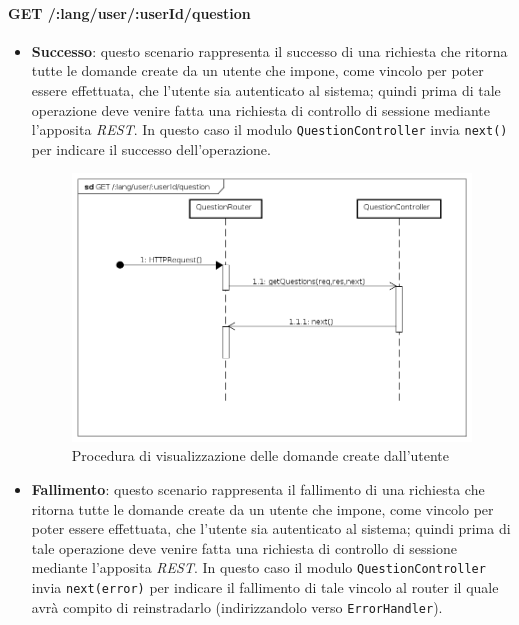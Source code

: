 
\paragraph{GET /:lang/user/:userId/question}
\begin{itemize}
\item \textbf{Successo}: questo scenario rappresenta il successo di una richiesta che ritorna tutte le domande create da un utente che impone, come vincolo per poter essere effettuata, che l'utente sia autenticato al sistema; quindi prima di tale operazione deve venire fatta una richiesta di controllo di sessione mediante l'apposita \textit{REST}. In questo caso il modulo \texttt{QuestionController} invia \texttt{next()} per indicare il successo dell'operazione.

\begin{figure}[ht]
	\centering
	\includegraphics[scale=0.45]{UML/DiagrammiDiSequenza/Back-end/GET__lang_user__userId_question_success.png}
	\caption{Procedura di visualizzazione delle domande create dall'utente}
\end{figure}
\FloatBarrier

\item \textbf{Fallimento}: questo scenario rappresenta il fallimento di una richiesta che ritorna tutte le domande create da un utente che impone, come vincolo per poter essere effettuata, che l'utente sia autenticato al sistema; quindi prima di tale operazione deve venire fatta una richiesta di controllo di sessione mediante l'apposita \textit{REST}. In questo caso il modulo \texttt{QuestionController} invia \texttt{next(error)} per indicare il fallimento di tale vincolo al router il quale avrà compito di reinstradarlo (indirizzandolo verso \texttt{ErrorHandler}).


\end{itemize}
